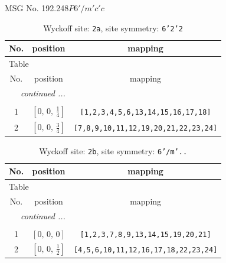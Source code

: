 \documentclass[fleqn,8pt]{jsarticle}
\begin{document}
\setcounter{MaxMatrixCols}{32}

\renewcommand{\tablename}{Table~}
\renewcommand{\figurename}{Figure~}
\begin{center}
\LARGE
MSG No. 192.248\quad$P6'/m'c'c$
\end{center}
\renewcommand{\arraystretch}{1.2}
\begin{longtable}{ccc}
\caption{Wyckoff site: {\tt 2a}, site symmetry: {\tt 6'2'2}}
 \\
 \hline \hline
No. & position & mapping \\ \hline \endfirsthead

\multicolumn{2}{l}{\tablename\ \thetable{}} \\
 \hline \hline
No. & position & mapping \\ \hline \endhead

 \hline \hline
\multicolumn{2}{r}{\footnotesize\it continued ...} \\ \endfoot

 \hline \hline
\multicolumn{2}{r}{} \\ \endlastfoot

1 & $\left[ 0,\, 0,\, \frac{1}{4} \right]$ & {\tt [1,2,3,4,5,6,13,14,15,16,17,18]} \\ \hline
2 & $\left[ 0,\, 0,\, \frac{3}{4} \right]$ & {\tt [7,8,9,10,11,12,19,20,21,22,23,24]} \\
\end{longtable}
\renewcommand{\arraystretch}{1.2}
\begin{longtable}{ccc}
\caption{Wyckoff site: {\tt 2b}, site symmetry: {\tt 6'/m'..}}
 \\
 \hline \hline
No. & position & mapping \\ \hline \endfirsthead

\multicolumn{2}{l}{\tablename\ \thetable{}} \\
 \hline \hline
No. & position & mapping \\ \hline \endhead

 \hline \hline
\multicolumn{2}{r}{\footnotesize\it continued ...} \\ \endfoot

 \hline \hline
\multicolumn{2}{r}{} \\ \endlastfoot

1 & $\left[ 0,\, 0,\, 0 \right]$ & {\tt [1,2,3,7,8,9,13,14,15,19,20,21]} \\ \hline
2 & $\left[ 0,\, 0,\, \frac{1}{2} \right]$ & {\tt [4,5,6,10,11,12,16,17,18,22,23,24]} \\
\end{longtable}
\end{document}
